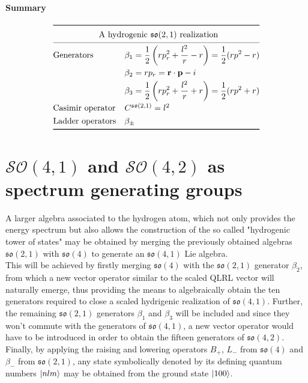 \documentclass[12pt,a4paper]{report}
\theoremstyle{definition}
\theoremstyle{remark}
\theoremstyle{remark}
\begin{document}
\subsubsection{Summary}
\begin{equation*}
\def\arraystretch{1.3}
\begin{array}{@{}ll@{}}
\toprule
 \multicolumn{2}{c@{}}{\text{A hydrogenic }\mathfrak{so}(2,1) \text{ realization}} \\
\cmidrule{1-2}
 \text{Generators} & \begin{aligned}[t]
  \beta_1&=\frac{1}{2}\left(rp_r^2+\frac{l^2}{r}-r\right)=\frac{1}{2}(rp^2-r)\\
  \beta_2&=rp_r=\textbf{r}\cdot\textbf{p}-i\\
  \beta_3&=\frac{1}{2}\left(rp_r^2+\frac{l^2}{r}+r\right)=\frac{1}{2}(rp^2+r)
  \end{aligned}\\
 \text{Casimir operator} & C^{\mathfrak{so}(2,1)}=l^2\\
 \text{Ladder operators} & \beta_\pm\\
\bottomrule
\end{array}
\end{equation*}


\chapter{$\mathcal{SO}(4,1)$ and $\mathcal{SO}(4,2)$ as spectrum generating groups}
A larger algebra associated to the hydrogen atom, which not only provides the energy spectrum but also allows the construction of the so called "hydrogenic tower of states" may be obtained by merging the previously obtained algebras $\mathfrak{so}(2,1)$ with $\mathfrak{so}(4)$ to generate an $\mathfrak{so}(4,1)$ Lie algebra. \\ \indent
This will be achieved by firstly merging $\mathfrak{so}(4)$ with the $\mathfrak{so}(2,1)$ generator $\beta_2$, from which a new vector operator similar to the scaled QLRL vector will naturally emerge, thus providing the means to algebraically obtain the ten generators required to close a scaled hydrigenic realization of $\mathfrak{so}(4,1)$. Further, the remaining $\mathfrak{so}(2,1)$ generators $\beta_1$ and $\beta_3$ will be included and since they won't commute with the generators of $\mathfrak{so}(4,1)$, a new vector operator would have to be introduced in order to obtain the fifteen generators of $\mathfrak{so}(4,2)$. \\ \indent
Finally, by applying the raising and lowering operators $B_+$, $L_-$ from $\mathfrak{so}(4)$ and $\beta_-$ from $\mathfrak{so}(2,1)$, any state symbolically denoted by its defining quantum numbers $\ket{nlm}$ may be obtained from the ground state $\ket{100}$.
\end{document}
